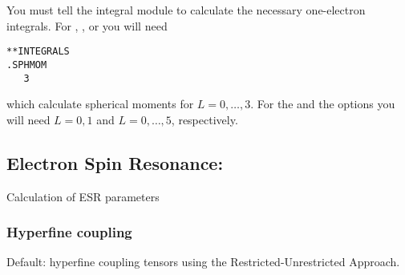 
You must tell the integral module to calculate the necessary one-electron integrals.
For , , or  you will need

\begin{verbatim}
**INTEGRALS
.SPHMOM
   3
\end{verbatim}

which calculate spherical moments for $L = 0, \ldots, 3$.
For the  and the  options
you will need $L = 0, 1$ and $L = 0, \ldots, 5$, respectively.

\subsection{Electron Spin Resonance: }

Calculation of ESR parameters

\subsubsection{Hyperfine coupling}

Default: hyperfine coupling tensors using
the Restricted-Unrestricted Approach.

